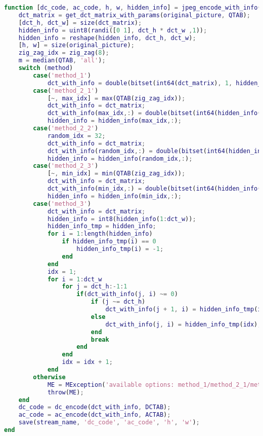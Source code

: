 \documentclass[a4paper]{article}
\begin{document}
\begin{lstlisting}[language=matlab, caption=信息编码]
function [dc_code, ac_code, h, w, hidden_info] = jpeg_encode_with_info(original_picture, stream_name, QTAB, DCTAB, ACTAB, method)
    dct_matrix = get_dct_matrix_with_params(original_picture, QTAB);
    [dct_h, dct_w] = size(dct_matrix);
    hidden_info = uint8(randi([0 1], dct_h * dct_w ,1));
    hidden_info = reshape(hidden_info, dct_h, dct_w);
    [h, w] = size(original_picture);
    zig_zag_idx = zig_zag(8);
    m = median(QTAB, 'all');
    switch (method)
        case('method_1')
            dct_with_info = double(bitset(int64(dct_matrix), 1, hidden_info));
        case('method_2_1')
            [~, max_idx] = max(QTAB(zig_zag_idx));
            dct_with_info = dct_matrix;
            dct_with_info(max_idx,:) = double(bitset(int64(hidden_info(max_idx,:)), 1, hidden_info(max_idx,:)));
            hidden_info = hidden_info(max_idx,:);
        case('method_2_2')
            random_idx = 32;
            dct_with_info = dct_matrix;
            dct_with_info(random_idx,:) = double(bitset(int64(hidden_info(random_idx,:)), 1, hidden_info(random_idx,:)));
            hidden_info = hidden_info(random_idx,:);
        case('method_2_3')
            [~, min_idx] = min(QTAB(zig_zag_idx));
            dct_with_info = dct_matrix;
            dct_with_info(min_idx,:) = double(bitset(int64(hidden_info(min_idx,:)), 1, hidden_info(min_idx,:)));
            hidden_info = hidden_info(min_idx,:);
        case('method_3')
            dct_with_info = dct_matrix;
            hidden_info = int8(hidden_info(1:dct_w));
            hidden_info_tmp = hidden_info;
            for i = 1:length(hidden_info)
                if hidden_info_tmp(i) == 0  
                    hidden_info_tmp(i) = -1;
                end
            end
            idx = 1;
            for i = 1:dct_w
                for j = dct_h:-1:1
                    if(dct_with_info(j, i) ~= 0)
                        if (j ~= dct_h)
                            dct_with_info(j + 1, i) = hidden_info_tmp(idx);
                        else
                            dct_with_info(j, i) = hidden_info_tmp(idx);
                        end
                        break
                    end
                end
                idx = idx + 1;
            end
        otherwise
            ME = MException('available options: method_1/method_2_1/method_2_2/method_2_3/method_3');
            throw(ME);
    end
    dc_code = dc_encode(dct_with_info, DCTAB);
    ac_code = ac_encode(dct_with_info, ACTAB);
    save(stream_name, 'dc_code', 'ac_code', 'h', 'w');
end
\end{lstlisting}
\end{document}
